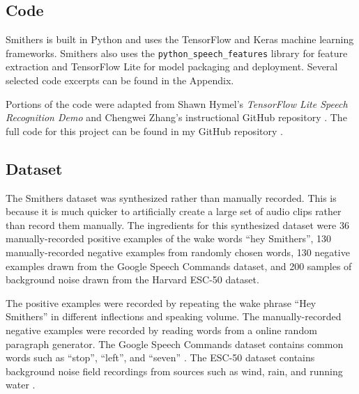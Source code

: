 \documentclass[conference]{IEEEtran}
\newcommand{\code}[1]{\texttt{#1}}
\begin{document}
\subsection{Code}
Smithers is built in Python and uses the TensorFlow and Keras machine learning frameworks.
Smithers also uses the \code{python\_speech\_features} library for feature extraction
and TensorFlow Lite for model packaging and deployment.
Several selected code excerpts can be found in the Appendix.

Portions of the code were adapted from Shawn Hymel's \textit{TensorFlow Lite Speech Recognition Demo}
and Chengwei Zhang's instructional GitHub repository \cite{hymel} \cite{tony}.
The full code for this project can be found in my GitHub repository \cite{jake}.

\subsection{Dataset} \label{sec:dataset}
The Smithers dataset was synthesized rather than manually recorded.
This is because it is much quicker to artificially create a large set of audio clips
rather than record them manually.
The ingredients for this synthesized dataset were 
36 manually-recorded positive examples of the wake words ``hey Smithers'',
130 manually-recorded negative examples from randomly chosen words,
130 negative examples drawn from the Google Speech Commands dataset,
and 200 samples of background noise drawn from the Harvard ESC-50 dataset.

The positive examples were recorded by repeating the wake phrase ``Hey Smithers''
in different inflections and speaking volume.
The manually-recorded negative examples were recorded 
by reading words from a online random paragraph generator.
The Google Speech Commands dataset contains common words such as ``stop'', ``left'', and ``seven'' \cite{aiblog}.
The ESC-50 dataset contains background noise field recordings
from sources such as wind, rain, and running water \cite{noise}.
\end{document}
